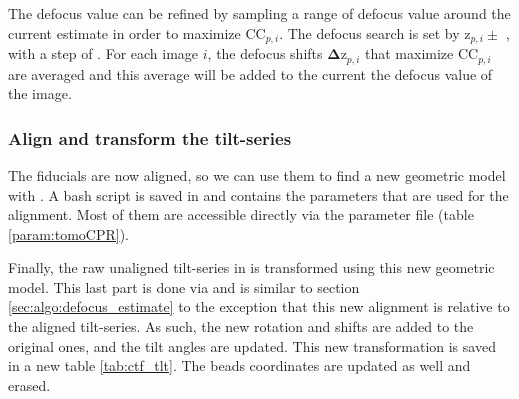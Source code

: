 The defocus value can be refined by sampling a range of defocus value around the current estimate in order to maximize $\mathrm{CC}_{p,i}$. The defocus search is set by $\bm{\mathrm{z}}_{p,i} \pm $ , with a step of . For each image $i$, the defocus shifts $\bm{\Delta \mathrm{z}}_{p,i}$ that maximize $\mathrm{CC}_{p,i}$ are averaged and this average will be added to the current the defocus value of the image.

\subsubsection{Align and transform the tilt-series}

The fiducials are now aligned, so we can use them to find a new geometric model with {\tiltalign}. A bash script is saved in  and contains the parameters that are used for the alignment. Most of them are accessible directly via the {\emClarity} parameter file (table \ref{param:tomoCPR}).

Finally, the raw unaligned tilt-series in  is transformed using this new geometric model. This last part is done via  and is similar to section \ref{sec:algo:defocus_estimate} to the exception that this new alignment is relative to the aligned tilt-series. As such, the new rotation and shifts are added to the original ones, and the tilt angles are updated. This new transformation is saved in a new table \ref{tab:ctf_tlt}. The beads coordinates are updated as well and erased.






